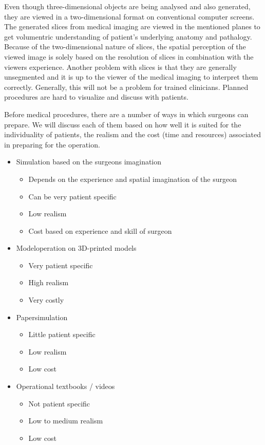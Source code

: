 Even though three-dimensional objects are being analysed and also generated, they are viewed in a two-dimensional format on conventional computer screens.
The generated slices from medical imaging are viewed in the mentioned planes to get volumentric understanding of patient's underlying anatomy and pathalogy.
Because of the two-dimensional nature of slices, the spatial perception of the viewed image is solely based on the resolution of slices in combination with the viewers experience.
Another problem with slices is that they are generally unsegmented and it is up to the viewer of the medical imaging to interpret them correctly.
Generally, this will not be a problem for trained clinicians. Planned procedures are hard to visualize and discuss with patients.

Before medical procedures, there are a number of ways in which surgeons can prepare.
We will discuss each of them based on how well it is suited for the individuality of patients, the realism and the cost (time and resources) associated in preparing for the operation.

\begin{itemize}
    \item Simulation based on the surgeons imagination
    \begin{itemize}
        \item Depends on the experience and spatial imagination of the surgeon
        \item Can be very patient specific
        \item Low realism
        \item Cost based on experience and skill of surgeon
    \end{itemize}
    \item Modeloperation on 3D-printed models
    \begin{itemize}
        \item Very patient specific
        \item High realism
        \item Very costly
    \end{itemize}
    \item Papersimulation
    \begin{itemize}
        \item Little patient specific
        \item Low realism
        \item Low cost
    \end{itemize}
    \item Operational textbooks / videos
    \begin{itemize}
        \item Not patient specific
        \item Low to medium realism
        \item Low cost
    \end{itemize}
\end{itemize}


